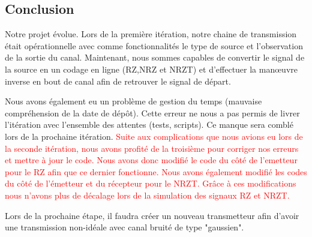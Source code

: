\subsection{Conclusion}

Notre projet évolue. Lors de la première itération, notre chaine de transmission était opérationnelle avec comme fonctionnalités le type de source et l'observation de la sortie du canal.
Maintenant, nous sommes capables de convertir le signal de la source en un codage en ligne (RZ,NRZ et NRZT) et d'effectuer la manœuvre inverse en bout de canal afin de retrouver le signal de départ.

Nous avons également eu un problème de gestion du temps (mauvaise compréhension de la date de dépôt). Cette erreur ne nous a pas permis de livrer l'itération avec l'ensemble des attentes (tests, scripts). Ce manque sera comblé lors de la prochaine itération.
\textcolor{red}{Suite aux complications que nous avions eu lors de la seconde itération, nous avons profité de la troisième pour corriger nos erreurs et mettre à jour le code. Nous avons donc modifié le code du côté de l'emetteur pour le RZ afin que ce dernier fonctionne. Nous avons également modifié les codes du côté de l'émetteur et du récepteur pour le NRZT. Grâce à ces modifications nous n'avons plus de décalage lors de la simulation des signaux RZ et NRZT.}

Lors de la prochaine étape, il faudra créer un nouveau transmetteur afin d'avoir une transmission non-idéale avec canal bruité de type "gaussien".